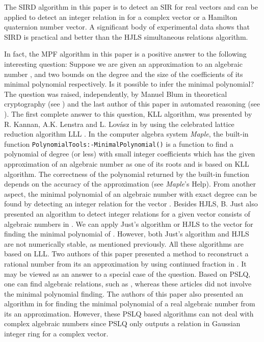 \documentclass{sig-alternate}
\numberwithin{theorem}{section} \numberwithin{equation}{section}
\begin{document}
The SIRD algorithm in this paper is to detect an SIR for  real
vectors and can be applied to detect an integer relation in
 for a
 complex vector or a Hamilton quaternion number vector. A significant
body of experimental data shows that SIRD is practical and better
than the HJLS simultaneous relations algorithm.



In fact, the MPF algorithm in this paper is a  positive answer to
the following interesting question: Suppose we are given an
approximation to an algebraic number , and two bounds on the
degree and  the size of the coefficients of its minimal polynomial
respectively. Is it possible to infer the minimal polynomial? The
question was raised, independently, by Manuel Blum  in theoretical
cryptography (see \cite{KLL1984,KLL1988}) and the last author of
this paper  in automated reasoning (see \cite{YZH1996}). The first
complete answer to this question, KLL algorithm, was presented by R.
Kannan, A.K. Lenstra and L. Lov{\'a}sz in \cite{KLL1984, KLL1988} by
using the celebrated lattice reduction algorithm LLL \cite{LLL1982}.
In the computer algebra system \emph{Maple}, the built-in function
\texttt{PolynomialTools:-MinimalPolynomial()} is a function to find
a polynomial of degree  (or less) with small integer coefficients
which has the given approximation  of an algebraic number as one
of its roots and is based on  KLL algorithm. The correctness of the
polynomial returned by the built-in function
depends on the accuracy of the approximation (see \emph{Maple}'s Help). From another aspect, the minimal
polynomial of an algebraic number  with exact degree  can
be found by detecting an integer relation for the vector . Besides
HJLS, B. Just also presented an algorithm to detect integer relations for
a given vector consists of algebraic numbers in \cite{Jus1989}. We
can apply Just's algorithm or  HJLS  to the vector  for
finding the minimal polynomial of .
However, both Just's algorithm and HJLS are not numerically stable, as mentioned previously. All these
algorithms are based on LLL. Two authors of this paper presented a
method to reconstruct a rational number from its an approximation by
using continued fraction in \cite{ZF2007}. It may be viewed as an
answer to a special case of  the question.
Based on PSLQ, one can find algebraic relations, such as \cite{BC1999, BL2000, BHM2002, BBK2006}, whereas these
articles did not involve the minimal polynomial finding. The authors
of this paper also presented an algorithm in \cite{QFC2009} for
finding the minimal polynomial of a real algebraic number from its
an approximation. However, these PSLQ based algorithms can not deal
with complex algebraic numbers since PSLQ only outputs  a relation
in Gaussian integer ring
 for a complex vector. 
\end{document}
